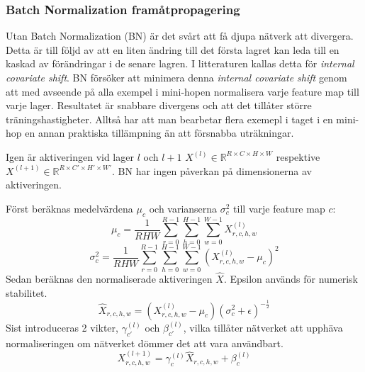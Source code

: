 \documentclass[a4paper,11pt,twoside]{article}
\begin{document}
\subsubsection{Batch Normalization framåtpropagering}
Utan Batch Normalization (BN) är det svårt att få djupa nätverk att divergera. Detta är till följd av att en liten ändring till det första lagret kan leda till en kaskad av förändringar i de senare lagren. I litteraturen kallas detta för \textit{internal covariate shift}. BN försöker att minimera denna \textit{internal covariate shift} genom att med avseende på alla exempel i mini-hopen normalisera varje feature map till varje lager. Resultatet är snabbare divergens och att det tillåter större träningshastigheter. Alltså har att man bearbetar flera exemepl i taget i en mini-hop en annan praktiska tillämpning än att försnabba uträkningar. \cite{cs231n} \cite{batchnorm}

Igen är aktiveringen vid lager $l$ och $l+1$ $X^{(l)} \in \mathbb{R}^{R \times C \times H \times W}$ respektive $X^{(l+1)} \in \mathbb{R}^{R \times C' \times H' \times W'}$. BN har ingen påverkan på dimensionerna av aktiveringen. \cite{cs231n} \cite{batchnorm}

Först beräknas medelvärdena $\mu_c$ och varianserna $\sigma^2_c$ till varje feature map $c$: \cite{cs231n} \cite{batchnorm}
\begin{equation}
\mu_c = \frac{1}{RHW} \sum^{R-1}_{r=0} \sum^{H-1}_{h=0} \sum^{W-1}_{w=0} X^{(l)}_{r,c,h,w}
\end{equation}
\begin{equation}
\sigma^2_c  = \frac{1}{RHW} \sum^{R-1}_{r=0} \sum^{H-1}_{h=0} \sum^{W-1}_{w=0} ({X^{(l)}_{r,c,h,w} - \mu_c})^2
\end{equation}
Sedan beräknas den normaliserade aktiveringen $\hat{X}$. Epsilon används för numerisk stabilitet. \cite{cs231n} \cite{batchnorm}
\begin{equation}
\hat{X}_{r,c,h,w} = (X^{(l)}_{r,c,h,w} - \mu_c){(\sigma^2_c + \epsilon)}^{-\frac{1}{2}}
\end{equation}
Sist introduceras 2 vikter, $\gamma_{c'}^{(l)}$ och $\beta_{c'}^{(l)}$, vilka tillåter nätverket att upphäva normaliseringen om nätverket dömmer det att vara användbart. \cite{cs231n} \cite{batchnorm}
\begin{equation}
X^{(l+1)}_{r,c,h,w} = \gamma_{c}^{(l)} \hat{X}_{r,c,h,w} + \beta_{c}^{(l)}
\end{equation}
\end{document}
